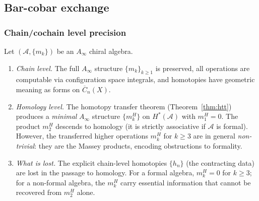 
\subsection{Bar-cobar exchange}

\subsubsection{Chain/cochain level precision}

\begin{theorem}
\label{thm:chain-vs-homology}
Let $(\mathcal{A}, \{m_k\})$ be an $A_\infty$ chiral algebra.
\begin{enumerate}[label=\textup{(\roman*)}]
\item \emph{Chain level.}
 The full $A_\infty$ structure $\{m_k\}_{k \geq 1}$ is preserved,
 all operations are computable via configuration space integrals,
 and homotopies have geometric meaning as forms on
 $\overline{C}_n(X)$.
\item \emph{Homology level.}
 The homotopy transfer theorem
 (Theorem~\ref{thm:htt}) produces a \emph{minimal}
 $A_\infty$ structure $\{m_k^H\}$ on $H^*(\mathcal{A})$ with
 $m_1^H = 0$. The product $m_2^H$ descends to homology
 (it is strictly associative if $\mathcal{A}$ is formal).
 However, the transferred higher operations
 $m_k^H$ for $k \geq 3$ are in general \emph{non-trivial}:
 they are the Massey products, encoding obstructions to formality.
\item \emph{What is lost.}
 The explicit chain-level homotopies $\{h_n\}$ (the contracting
	 data) are lost in the passage to homology. For a formal algebra,
	 $m_k^H = 0$ for $k \geq 3$; for a non-formal
	 algebra, the $m_k^H$ carry essential information that cannot be
 recovered from $m_2^H$ alone.
\end{enumerate}
\end{theorem}

